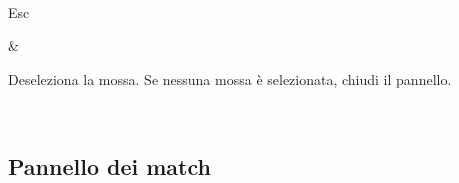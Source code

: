 \documentclass[letterpaper,10pt,italian]{sphinxmanual}
\begin{document}
\begin{savenotes}
\begin{tabular}[t]{}
\\
\sphinxhline\begin{varwidth}[t]{}
\sphinxAtStartPar
Esc
\sphinxbeforeendvarwidth
\end{varwidth}%
&\begin{varwidth}[t]{}
\sphinxAtStartPar
Deseleziona la mossa. Se nessuna mossa è selezionata, chiudi il pannello.
\sphinxbeforeendvarwidth
\end{varwidth}%
\\
\sphinxbottomrule
\end{tabular}
\sphinxtableafterendhook\par
\sphinxattableend\end{savenotes}


\subsection{Pannello dei match}
\label{\detokenize{raccourcis:panneau-des-matchs}}\label{\detokenize{raccourcis:raccourcis-match-panel}}
\end{document}
